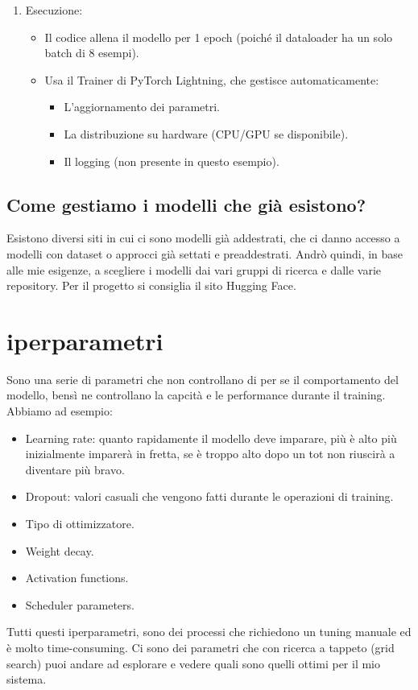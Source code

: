 \documentclass[a4paper,12pt]{article}
\begin{document}
\begin{enumerate}
\begin{itemize}
    \end{itemize}
    \item Esecuzione: 
    \begin{itemize}
        \item Il codice allena il modello per 1 epoch (poiché il dataloader ha un solo batch di 8 esempi).
        \item Usa il Trainer di PyTorch Lightning, che gestisce automaticamente:
        \begin{itemize}
            \item L'aggiornamento dei parametri.
            \item La distribuzione su hardware (CPU/GPU se disponibile).
            \item Il logging (non presente in questo esempio).
        \end{itemize}
    \end{itemize}
\end{enumerate}

\subsection{Come gestiamo i modelli che già esistono?}
Esistono diversi siti in cui ci sono modelli già addestrati, che ci danno accesso a modelli con dataset o approcci già settati e preaddestrati. 
Andrò quindi, in base alle mie esigenze, a scegliere i modelli dai vari gruppi di ricerca e dalle varie repository. Per il progetto si consiglia il sito Hugging Face.
\section{iperparametri}
Sono una serie di parametri che non controllano di per se il comportamento del modello, bensì ne controllano la capcità e le performance durante il training.
Abbiamo ad esempio:
\begin{itemize}
    \item Learning rate: quanto rapidamente il modello deve imparare, più è alto più inizialmente imparerà in fretta, se è troppo alto dopo un tot non riuscirà a diventare più bravo.
    \item Dropout: valori casuali che vengono fatti durante le operazioni di training.
    \item Tipo di ottimizzatore. 
    \item Weight decay.
    \item Activation functions. 
    \item Scheduler parameters.
\end{itemize}
Tutti questi iperparametri, sono dei processi che richiedono un tuning manuale ed è molto time-consuming. Ci sono dei parametri che con ricerca a tappeto (grid search) puoi andare ad esplorare e vedere quali sono quelli ottimi per il mio sistema. 
\end{document}
